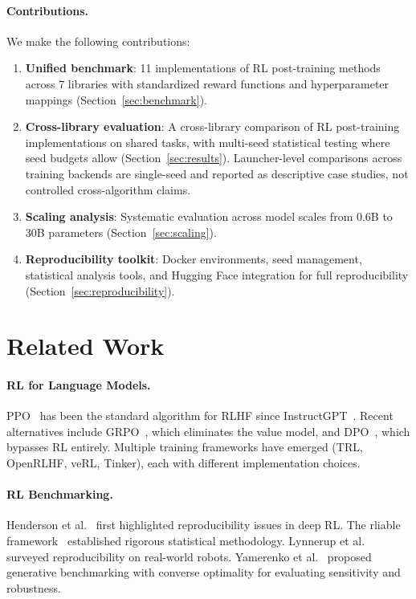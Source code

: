 \documentclass[manuscript,review,anonymous]{acmart}
\begin{document}
\paragraph{Contributions.} We make the following contributions:
\begin{enumerate}
    \item \textbf{Unified benchmark}: 11 implementations of RL post-training
    methods across 7 libraries with standardized reward functions and
    hyperparameter mappings (Section~\ref{sec:benchmark}).
    \item \textbf{Cross-library evaluation}: A cross-library comparison of RL
    post-training implementations on shared tasks, with multi-seed statistical
    testing where seed budgets allow (Section~\ref{sec:results}). Launcher-level
    comparisons across training backends are single-seed and reported as
    descriptive case studies, not controlled cross-algorithm claims.
    \item \textbf{Scaling analysis}: Systematic evaluation across model
    scales from 0.6B to 30B parameters (Section~\ref{sec:scaling}).
    \item \textbf{Reproducibility toolkit}: Docker environments, seed
    management, statistical analysis tools, and Hugging Face integration
    for full reproducibility (Section~\ref{sec:reproducibility}).
\end{enumerate}

\section{Related Work}
\label{sec:related}


\paragraph{RL for Language Models.}
PPO~\cite{schulman2017proximal} has been the standard algorithm for RLHF since
InstructGPT~\cite{ouyang2022training}. Recent alternatives include
GRPO~\cite{shao2024deepseekmath}, which eliminates the value model, and
DPO~\cite{rafailov2024direct}, which bypasses RL entirely. Multiple training
frameworks have emerged (TRL, OpenRLHF, veRL, Tinker), each with different
implementation choices.

\paragraph{RL Benchmarking.}
Henderson et al.~\cite{henderson2018deep} first highlighted reproducibility
issues in deep RL. The rliable framework~\cite{agarwal2021deep} established
rigorous statistical methodology. Lynnerup et al.~\cite{lynnerup2019survey}
surveyed reproducibility on real-world robots. Yamerenko et al.~\cite{yamerenko2025generating}
proposed generative benchmarking with converse optimality for evaluating
sensitivity and robustness.
\end{document}
